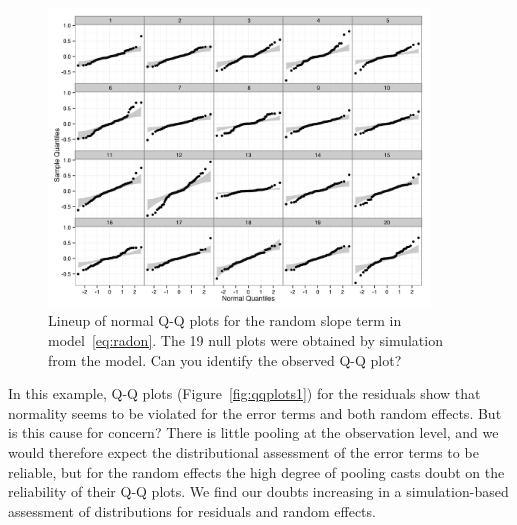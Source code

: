 \documentclass[11pt]{article} %
\begin{document}
\begin{figure}[htb]
	\centering
	\includegraphics[width=0.9\textwidth]{test.jpeg}%
	\caption{\label{fig:lineup} Lineup of normal Q-Q plots for the random slope term in model~\eqref{eq:radon}. The 19 null plots were obtained by simulation from the model. Can you identify the observed Q-Q plot?}
\end{figure}

In this example, %
Q-Q plots (Figure~\ref{fig:qqplots1}) for the residuals show that normality 
seems to be violated 
for the error terms and both random effects. But is this cause for concern?
There is little pooling at the observation level, and we would therefore expect the distributional assessment of the error terms to be reliable, but  for the random effects the high degree of pooling  casts doubt on the reliability of their Q-Q plots. 
We find our doubts increasing in a simulation-based assessment of distributions for residuals and random effects.
\end{document}
